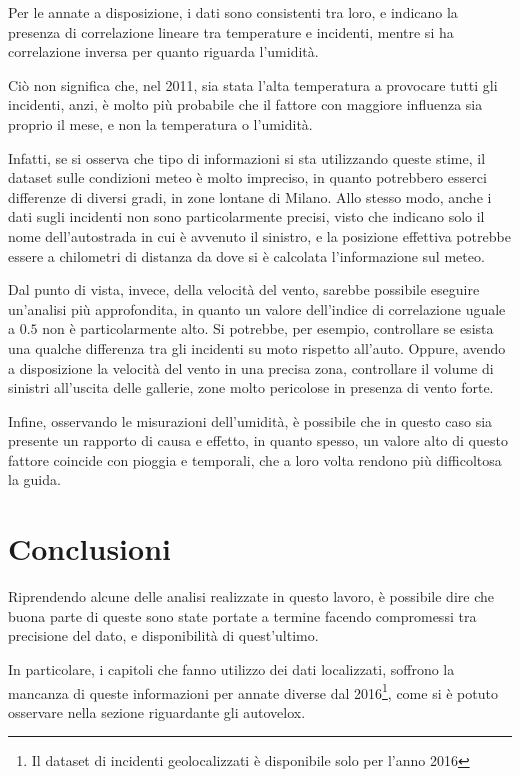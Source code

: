 \documentclass[a4paper,12pt]{report}
\begin{document}
Per le annate a disposizione, i dati sono consistenti tra loro, e indicano la presenza di 
correlazione lineare tra temperature e incidenti, mentre si ha correlazione inversa per quanto 
riguarda l'umidità.

Ciò non significa che, nel 2011, sia stata l'alta temperatura a provocare 
tutti gli incidenti, anzi, è molto più probabile che il fattore con maggiore 
influenza sia proprio il mese, e non la temperatura o l'umidità.

Infatti, se si osserva che tipo di informazioni si sta utilizzando 
queste stime, il dataset sulle condizioni meteo è molto impreciso, in quanto potrebbero 
esserci differenze di diversi gradi, in zone lontane di Milano.
Allo stesso modo, anche i dati sugli incidenti non sono particolarmente precisi, 
visto che indicano solo il nome dell'autostrada in cui è avvenuto 
il sinistro, e la posizione effettiva potrebbe essere a chilometri di distanza da dove 
si è calcolata l'informazione sul meteo.

Dal punto di vista, invece, della velocità del vento, sarebbe possibile eseguire 
un'analisi più approfondita, in quanto un valore dell'indice di correlazione uguale 
a $0.5$ non è particolarmente alto.
Si potrebbe, per esempio, controllare se esista una qualche differenza tra gli 
incidenti su moto rispetto all'auto. 
Oppure, avendo a disposizione la velocità del vento in una precisa zona, controllare 
il volume di sinistri all'uscita delle gallerie, zone molto pericolose 
in presenza di vento forte.

Infine, osservando le misurazioni dell'umidità, è possibile che in questo caso sia presente 
un rapporto di causa e effetto, in quanto spesso, un valore alto di questo fattore 
coincide con pioggia e temporali, che a loro volta rendono più difficoltosa la guida.


\chapter{Conclusioni}

Riprendendo alcune delle analisi realizzate in questo lavoro, è possibile dire che buona 
parte di queste sono state portate a termine facendo compromessi tra precisione del dato, e 
disponibilità di quest'ultimo.

In particolare, i capitoli che fanno utilizzo dei dati localizzati, soffrono la mancanza di 
queste informazioni per annate diverse dal 
2016\footnote{Il dataset di incidenti geolocalizzati è disponibile solo per l'anno 2016}, 
come si è potuto osservare nella sezione riguardante gli autovelox. 
\end{document}
